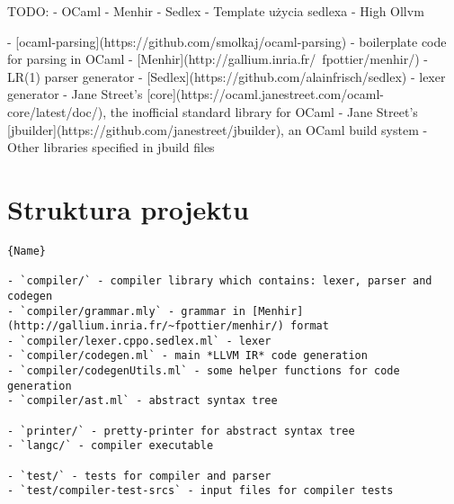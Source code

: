 \documentclass[declaration,shortabstract]{iithesis}
\begin{document}
TODO:
- OCaml 
- Menhir 
- Sedlex 
- Template użycia sedlexa
- High Ollvm 


- [ocaml-parsing](https://github.com/smolkaj/ocaml-parsing) - boilerplate code for parsing in OCaml
- [Menhir](http://gallium.inria.fr/~fpottier/menhir/) - LR(1) parser generator
- [Sedlex](https://github.com/alainfrisch/sedlex) - lexer generator
- Jane Street's [core](https://ocaml.janestreet.com/ocaml-core/latest/doc/), the inofficial standard library for OCaml
- Jane Street's [jbuilder](https://github.com/janestreet/jbuilder), an OCaml build system
- Other libraries specified in jbuild files


\section{Struktura projektu}

\begin{lstlisting}[caption=Instancja klasy w OCamlu, frame=tlrb]{Name}

- `compiler/` - compiler library which contains: lexer, parser and codegen
- `compiler/grammar.mly` - grammar in [Menhir](http://gallium.inria.fr/~fpottier/menhir/) format
- `compiler/lexer.cppo.sedlex.ml` - lexer
- `compiler/codegen.ml` - main *LLVM IR* code generation
- `compiler/codegenUtils.ml` - some helper functions for code generation
- `compiler/ast.ml` - abstract syntax tree

- `printer/` - pretty-printer for abstract syntax tree
- `langc/` - compiler executable

- `test/` - tests for compiler and parser
- `test/compiler-test-srcs` - input files for compiler tests

\end{lstlisting}

\end{document}
